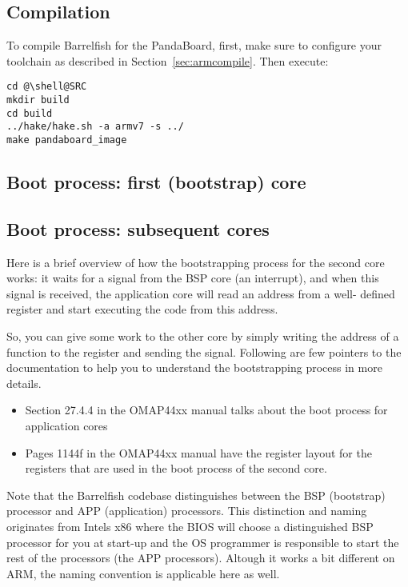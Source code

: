 \documentclass[a4paper,twoside]{report} %
\newcommand{\todo}[1]{\note{\textbf{TODO:} #1}}
\begin{document}
\subsection{Compilation}

To compile Barrelfish for the PandaBoard, first, make sure to
configure your toolchain as described in
Section~\ref{sec:armcompile}. Then execute:

\begin{lstlisting}
cd @\shell@SRC
mkdir build
cd build
../hake/hake.sh -a armv7 -s ../
make pandaboard_image
\end{lstlisting}

\subsection{Boot process: first (bootstrap) core}

\todo{From AOS writeup?}

\subsection{Boot process: subsequent cores}


Here is a brief overview of how the bootstrapping process for the second core
works: it waits for a signal from the BSP core (an interrupt), and when this
signal is received, the application core will read an address from a well-
defined register and start executing the code from this address.

So, you can give some work to the other core by simply writing the address of
a function to the register and sending the signal. Following are few pointers
to the documentation to help you to understand the bootstrapping process
in more details.

\begin{itemize}
\item Section 27.4.4 in the OMAP44xx manual talks about the boot process for
  application cores
\item Pages 1144f in the OMAP44xx manual have the register layout for the
  registers that are used in the boot process of the second core.
\end{itemize}

Note that the Barrelfish codebase distinguishes between the BSP (bootstrap)
processor and APP (application) processors. This distinction and naming
originates from Intels x86 where the BIOS will choose a distinguished BSP processor
for you at start-up and the OS programmer is responsible to start the rest
of the processors (the APP processors). Altough it works a bit different on
ARM, the naming convention is applicable here as well.
\end{document}
